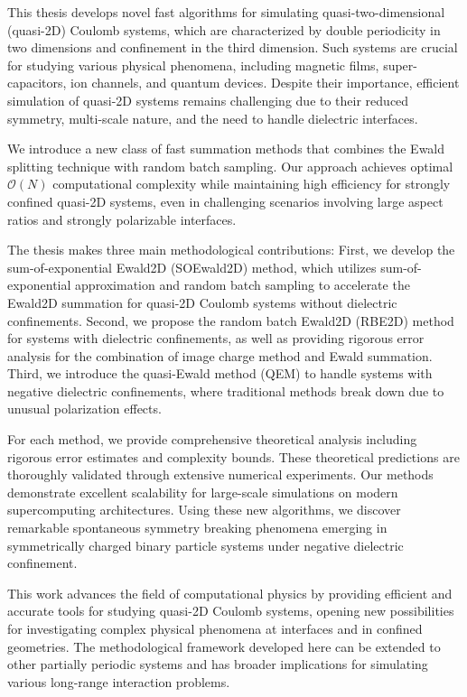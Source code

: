 This thesis develops novel fast algorithms for simulating quasi-two-dimensional (quasi-2D) Coulomb systems, which are characterized by double periodicity in two dimensions and confinement in the third dimension. 
Such systems are crucial for studying various physical phenomena, including magnetic films, super-capacitors, ion channels, and quantum devices. 
Despite their importance, efficient simulation of quasi-2D systems remains challenging due to their reduced symmetry, multi-scale nature, and the need to handle dielectric interfaces.

We introduce a new class of fast summation methods that combines the Ewald splitting technique with random batch sampling. 
Our approach achieves optimal $\mathcal{O}(N)$ computational complexity while maintaining high efficiency for strongly confined quasi-2D systems, even in challenging scenarios involving large aspect ratios and strongly polarizable interfaces.

The thesis makes three main methodological contributions:
First, we develop the sum-of-exponential Ewald2D (SOEwald2D) method, which utilizes sum-of-exponential approximation and random batch sampling to accelerate the Ewald2D summation for quasi-2D Coulomb systems without dielectric confinements. 
Second, we propose the random batch Ewald2D (RBE2D) method for systems with dielectric confinements, as well as providing rigorous error analysis for the combination of image charge method and Ewald summation. 
Third, we introduce the quasi-Ewald method (QEM) to handle systems with negative dielectric confinements, where traditional methods break down due to unusual polarization effects.

For each method, we provide comprehensive theoretical analysis including rigorous error estimates and complexity bounds. 
These theoretical predictions are thoroughly validated through extensive numerical experiments. 
Our methods demonstrate excellent scalability for large-scale simulations on modern supercomputing architectures. 
Using these new algorithms, we discover remarkable spontaneous symmetry breaking phenomena emerging in symmetrically charged binary particle systems under negative dielectric confinement.

This work advances the field of computational physics by providing efficient and accurate tools for studying quasi-2D Coulomb systems, opening new possibilities for investigating complex physical phenomena at interfaces and in confined geometries. 
The methodological framework developed here can be extended to other partially periodic systems and has broader implications for simulating various long-range interaction problems.